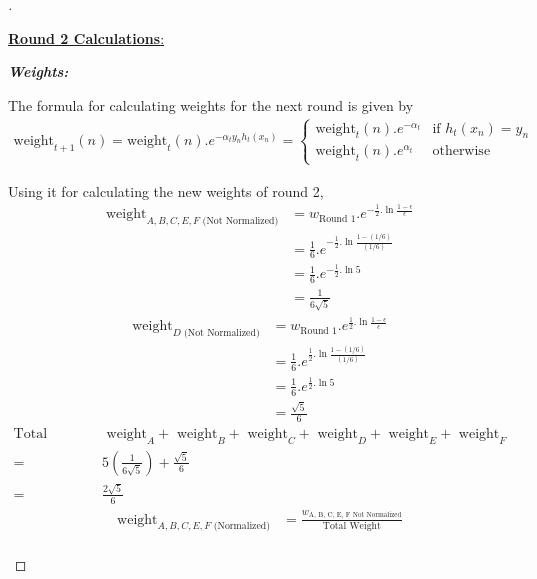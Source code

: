 \documentclass[a4paper, 12pt]{article}
\begin{document}
\begin{proof}[]
\begin{enumerate}[label={\color{blue}{\textbf{3.\arabic*})}}]
        \underline{\textbf{Round 2 Calculations}:}
        
        \textit{\textbf{Weights:}}
        
        The formula for calculating weights for the next round is given by
        \begin{align*}
        \text{weight}_{t+1}(n) = \text{weight}_t(n).e^{-\alpha_ty_nh_t(x_n)} = \begin{cases}
   \text{weight}_t(n).e^{-\alpha_t}& \text{if }h_t(x_n)=y_n\\    
   \text{weight}_t(n).e^{\alpha_t}& \text{otherwise}
\end{cases}
        \end{align*}
        
        Using it for calculating the new weights of round 2, 
        \begin{align*}
            \text{weight}_{A, B, C, E, F \text{ (Not Normalized)}}  &= w_{\text{Round 1}}.e^{-{\frac{1}{2}.\ln\frac{1-\epsilon}{\epsilon}}} \\
                    &= \frac{1}{6}.e^{-{\frac{1}{2}.\ln\frac{1-(1/6)}{(1/6)}}} \\  
                    &= \frac{1}{6}.e^{-{\frac{1}{2}.\ln 5}} \\  
                    &= \frac{1}{6\sqrt{5}}
        \end{align*}
        \begin{align*}
            \text{weight}_{D  \text{ (Not Normalized)}}  &= w_{\text{Round 1}}.e^{{\frac{1}{2}.\ln\frac{1-\epsilon}{\epsilon}}} \\
                    &= \frac{1}{6}.e^{{\frac{1}{2}.\ln\frac{1-(1/6)}{(1/6)}}} \\  
                    &= \frac{1}{6}.e^{{\frac{1}{2}.\ln 5}} \\  
                    &= \frac{\sqrt{5}}{6}
        \end{align*}
        \begin{align*}
            \text{Total Weight =}& \text{ weight}_{A} + \text{ weight}_{B} + \text{ weight}_{C} + \text{ weight}_{D} + \text{ weight}_{E} + \text{ weight}_{F}\\
            =& 5(\frac{1}{6\sqrt{5}}) + \frac{\sqrt{5}}{6}\\
            =& \frac{2\sqrt{5}}{6}
        \end{align*}
        \begin{align*}
            \text{weight}_{A, B, C, E, F \text{ (Normalized)}}  &= \frac{w_{\text{A, B, C, E, F Not Normalized}}}{\text{Total Weight}} \\

\end{align*}
\end{enumerate}
\end{proof}
\end{document}
